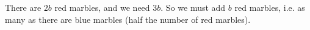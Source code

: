 There are $2b$ red marbles, and we need $3b$. So we must add $\boxed{b}$ red marbles, i.e. as many as there are blue marbles (half the number of red marbles).
